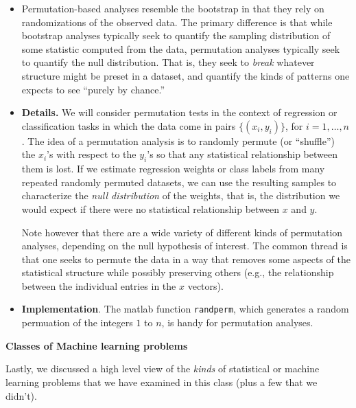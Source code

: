 \documentclass[11pt]{article}
\renewcommand{\tt}{\texttt}
\begin{document}
\begin{itemize}
\item Permutation-based analyses resemble the bootstrap in that they
  rely on randomizations of the observed data. The primary difference
  is that while bootstrap analyses typically seek to quantify the
  sampling distribution of some statistic computed from the data,
  permutation analyses typically seek to quantify the null
  distribution.  That is, they seek to {\it break} whatever structure
  might be preset in a dataset, and quantify the kinds of patterns one
  expects to see ``purely by chance.''

\item {\bf Details.}  We will consider permutation tests in the
  context of regression or classification tasks in which the data come
  in pairs $\{(x_i, y_i)\}$, for $i = 1, \ldots, n$.  The idea of a
  permutation analysis is to randomly permute (or ``shuffle'') the
  $x_i$'s with respect to the $y_i$'s so that any statistical
  relationship between them is lost.  If we estimate regression
  weights or class labels from many repeated randomly permuted
  datasets, we can use the resulting samples to characterize the {\it
    null distribution} of the weights, that is, the distribution we
  would expect if there were no statistical relationship between $x$
  and $y$.

  Note however that there are a wide variety of different kinds of
  permutation analyses, depending on the null hypothesis of interest.
  The common thread is that one seeks to permute the data in a way
  that removes some aspects of the statistical structure while
  possibly preserving others (e.g., the relationship between the
  individual entries in the $x$ vectors).


\item {\bf Implementation}.  The matlab function \tt{randperm}, which
  generates a random permuation of the integers $1$ to $n$, is
  handy for permutation analyses.

\end{itemize}

{\bf Classes of Machine learning problems}

Lastly, we discussed a high level view of the {\it kinds} of
statistical or machine
learning problems that we have examined in this class (plus a few
that we didn't).
\end{document}
